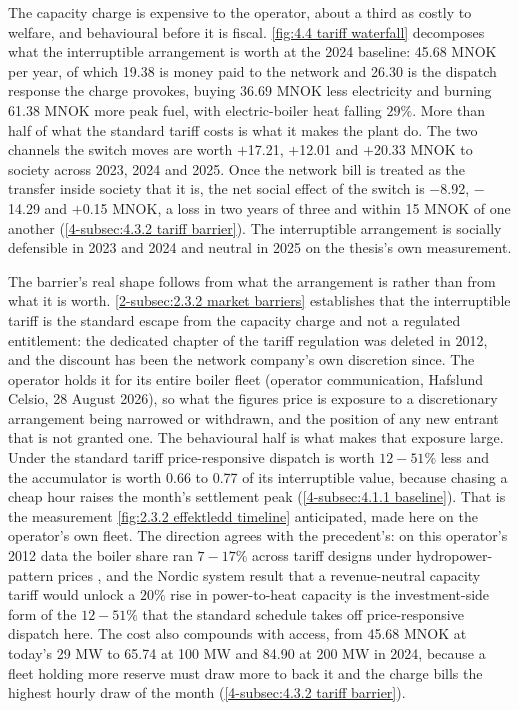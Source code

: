 The capacity charge is expensive to the operator, about a third as costly to welfare, and behavioural before it is fiscal. \autoref{fig:4.4 tariff waterfall} decomposes what the interruptible arrangement is worth at the 2024 baseline: 45.68 MNOK per year, of which 19.38 is money paid to the network and 26.30 is the dispatch response the charge provokes, buying 36.69 MNOK less electricity and burning 61.38 MNOK more peak fuel, with electric-boiler heat falling $29\%$. More than half of what the standard tariff costs is what it makes the plant do. The two channels the switch moves are worth $+$17.21, $+$12.01 and $+$20.33 MNOK to society across 2023, 2024 and 2025. Once the network bill is treated as the transfer inside society that it is, the net social effect of the switch is $-$8.92, $-$14.29 and $+$0.15 MNOK, a loss in two years of three and within 15 MNOK of one another (\autoref{4-subsec:4.3.2 tariff barrier}). The interruptible arrangement is socially defensible in 2023 and 2024 and neutral in 2025 on the thesis's own measurement.

The barrier's real shape follows from what the arrangement is rather than from what it is worth. \autoref{2-subsec:2.3.2 market barriers} establishes that the interruptible tariff is the standard escape from the capacity charge and not a regulated entitlement: the dedicated chapter of the tariff regulation was deleted in 2012, and the discount has been the network company's own discretion since. The operator holds it for its entire boiler fleet (operator communication, Hafslund Celsio, 28 August 2026), so what the figures price is exposure to a discretionary arrangement being narrowed or withdrawn, and the position of any new entrant that is not granted one. The behavioural half is what makes that exposure large. Under the standard tariff price-responsive dispatch is worth $12 - 51\%$ less and the accumulator is worth 0.66 to 0.77 of its interruptible value, because chasing a cheap hour raises the month's settlement peak (\autoref{4-subsec:4.1.1 baseline}). That is the measurement \autoref{fig:2.3.2 effektledd timeline} anticipated, made here on the operator's own fleet. The direction agrees with the precedent's: on this operator's 2012 data the boiler share ran $7 - 17\%$ across tariff designs under hydropower-pattern prices \cite{kirkerud_impacts_2016}, and the Nordic system result that a revenue-neutral capacity tariff would unlock a $20\%$ rise in power-to-heat capacity \cite{bergaentzle_cross-sector_2022} is the investment-side form of the $12 - 51\%$ that the standard schedule takes off price-responsive dispatch here. The cost also compounds with access, from 45.68 MNOK at today's 29 MW to 65.74 at 100 MW and 84.90 at 200 MW in 2024, because a fleet holding more reserve must draw more to back it and the charge bills the highest hourly draw of the month (\autoref{4-subsec:4.3.2 tariff barrier}).

